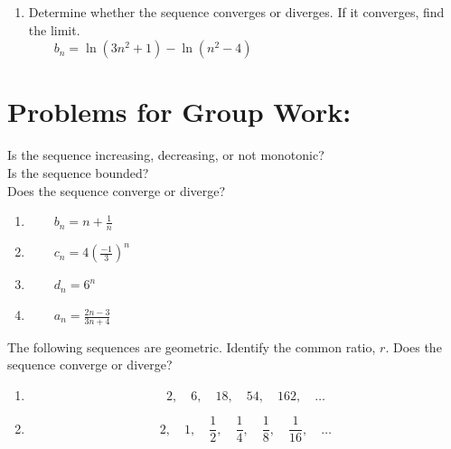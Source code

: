 \documentclass[10pt]{article}
\begin{document}
\begin{enumerate}
 


\vfill


\item Determine whether the sequence converges or diverges. If it converges, find the limit.\\
\(\qquad b_n = \ln(3n^2+1) - \ln(n^2-4)\)


\vfill



%

\end{enumerate}

\pagebreak

\section*{Problems for Group Work:}



Is the sequence increasing, decreasing, or not monotonic? \\
Is the sequence bounded?\\
Does the sequence converge or diverge?
\begin{enumerate}
\item \(\qquad b_n = n+\frac{1}{n}\)\vfill
\item \(\qquad c_n = 4\left(\frac{-1}{3}\right)^n\)\vfill
\item \(\qquad d_n = 6^n\)\vfill
\item \(\qquad a_n = \frac{2n-3}{3n+4}\)\vfill
\end{enumerate}

The following sequences are geometric. Identify the common ratio, \(r\). Does the sequence converge or diverge?
\begin{enumerate}
\addtocounter{enumi}{4}
\item
 \[
2, \quad 6, \quad 18, \quad 54, \quad 162, \quad \ldots
\]

\item
\[
2, \quad 1, \quad \frac{1}{2}, \quad \frac{1}{4}, \quad \frac{1}{8}, \quad \frac{1}{16}, \quad \ldots
\]

\end{enumerate}
\end{document}
